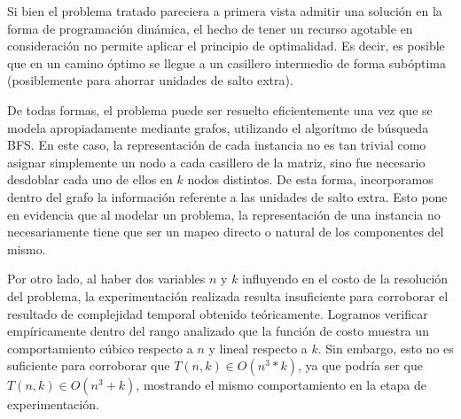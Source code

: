 Si bien el problema tratado pareciera a primera vista admitir una solución en la forma de programación dinámica, el hecho de tener un recurso agotable en consideración no permite aplicar el principio de optimalidad. Es decir, es posible que en un camino óptimo se llegue a un casillero intermedio de forma subóptima (posiblemente para ahorrar unidades de salto extra).

De todas formas, el problema puede ser resuelto eficientemente una vez que se modela apropiadamente mediante grafos, utilizando el algorítmo de búsqueda BFS. En este caso, la representación de cada instancia no es tan trivial como asignar simplemente un nodo a cada casillero de la matriz, sino fue necesario desdoblar cada uno de ellos en $k$ nodos distintos. De esta forma, incorporamos dentro del grafo la información referente a las unidades de salto extra. Esto pone en evidencia que al modelar un problema, la representación de una instancia no necesariamente tiene que ser un mapeo directo o natural de los componentes del mismo.

Por otro lado, al haber dos variables $n$ y $k$ influyendo en el costo de la resolución del problema, la experimentación realizada resulta insuficiente para corroborar el resultado de complejidad temporal obtenido teóricamente. Logramos verificar empíricamente dentro del rango analizado que la función de costo muestra un comportamiento cúbico respecto a $n$ y lineal respecto a $k$. Sin embargo, esto no es suficiente para corroborar que $T(n,k) \in O(n^3 * k)$, ya que podría ser que $T(n,k) \in O(n^3 + k)$, mostrando el mismo comportamiento en la etapa de experimentación.
